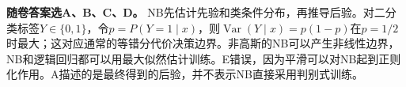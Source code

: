 \textbf{随卷答案选A、B、C、D。} NB先估计先验和类条件分布，再推导后验。对二分类标签\(Y\in\{0,1\}\)，令\(p=P(Y=1\mid x)\)，则\(\operatorname{Var}(Y\mid x)=p(1-p)\)在\(p=1/2\)时最大；这对应通常的等错分代价决策边界。非高斯的NB可以产生非线性边界，NB和逻辑回归都可以用最大似然估计训练。E错误，因为平滑可以对NB起到正则化作用。A描述的是最终得到的后验，并不表示NB直接采用判别式训练。
